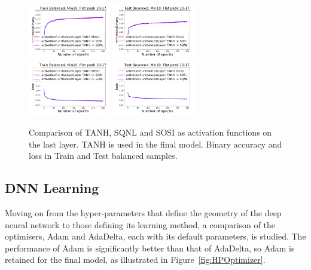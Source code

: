 \begin{figure}[!htb]
\centering
\includegraphics[width=0.32\textwidth]{plots/plot_01_1_overlay_graph_accuracyBinary_Train_ActivationFunctionLastLayer.pdf}
\includegraphics[width=0.32\textwidth]{plots/plot_01_1_overlay_graph_accuracyBinary_Test_ActivationFunctionLastLayer.pdf}\\
\includegraphics[width=0.32\textwidth]{plots/plot_01_1_overlay_graph_loss_Train_ActivationFunctionLastLayer.pdf}
\includegraphics[width=0.32\textwidth]{plots/plot_01_1_overlay_graph_loss_Test_ActivationFunctionLastLayer.pdf}\\
\caption{Comparison of TANH, SQNL and SOSI as activation functions on the last layer. TANH is used in the final model. Binary accuracy and loss in Train and Test balanced samples.}
\label{fig:HPActivationFunctionLastLayer}
\end{figure}

\subsection{DNN Learning}
\label{sec:DNNLearning}

Moving on from the hyper-parameters that define the geometry of the deep neural network to those defining its learning method, a comparison of the optimisers, Adam and AdaDelta, each with its default parameters, is studied. The performance of Adam is significantly better than that of AdaDelta, so Adam is retained for the final model, as illustrated in Figure~\ref{fig:HPOptimizer}.

